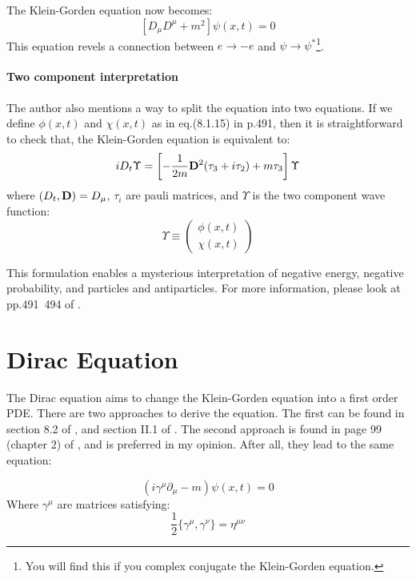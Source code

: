 \documentclass{article}
\begin{document}
The Klein-Gorden equation now becomes:
\begin{equation}
    \label{eq:kg-emfield}
    [D_\mu D^\mu+m^2] \psi(x,t) = 0
\end{equation}
This equation revels a connection between $e\to-e$ and
$\psi\to\psi^*$\footnote{You will find this if you complex conjugate
the Klein-Gorden equation.}.

\paragraph{Two component interpretation} The author also mentions a
way to split the equation into two equations. If we define $\phi(x,t)$
and $\chi(x,t)$ as in eq.(8.1.15) in p.491, then it is straightforward
to check that, the Klein-Gorden equation is equivalent to:
\begin{equation}
    iD_t \Upsilon = \left[
    -\frac{1}{2m}\vb{D}^2(\tau_3+i\tau_2)+m\tau_3 \right] \Upsilon
\end{equation}
where $(D_t,\vb{D})=D_\mu$, $\tau_i$ are pauli matrices, and $\Upsilon$ is the
two component wave function:
\begin{equation}
    \Upsilon \equiv \begin{pmatrix}
        \phi(x,t) \\ \chi(x,t)
    \end{pmatrix}
\end{equation}

This formulation enables a mysterious interpretation of negative energy,
negative probability, and particles and antiparticles. For more information,
please look at pp.491~494 of \cite{Sakurai2011}.

\section{Dirac Equation}
\label{sec:Dirac Equation}

The Dirac equation aims to change the Klein-Gorden equation into a first order
PDE. There are two approaches to derive the equation. The first can be found in
section 8.2 of \cite{Sakurai2011}, and section II.1 of \cite{zee2010quantum}.
The second approach is found in page 99 (chapter 2) of \cite{Greiner1997}, and
is preferred in my opinion. After all, they lead to the same equation:

\begin{equation}
    (i\gamma^\mu \partial_\mu - m) \psi(x,t) =0
    \label{eq:dirac-eq}
\end{equation}
Where $\gamma^\mu$ are matrices satisfying:
\begin{equation}
    \frac{1}{2}\{ \gamma^\mu,\gamma^\nu\} = \eta^{\mu\nu}
\end{equation}
\end{document}
